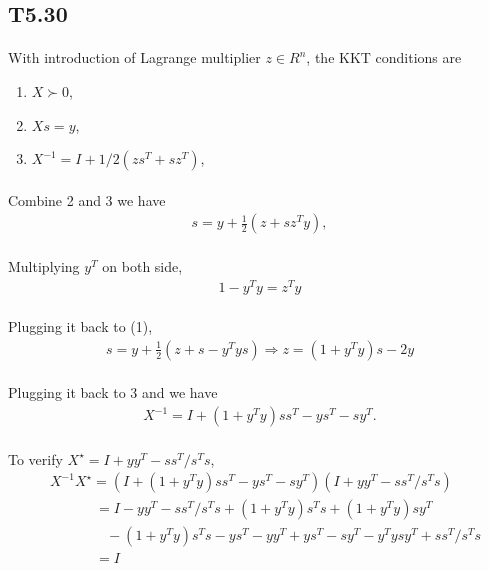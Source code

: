 \subsection*{T5.30}
\paragraph{}
With introduction of Lagrange multiplier $z \in R^n$, the KKT conditions are
\begin{enumerate}
	\item $X\succ 0$, 
	\item $Xs =y$,
	\item $X^{-1} = I +1/2(zs^T +sz^T)$,
\end{enumerate}
\paragraph{}
Combine 2 and 3 we have
\begin{align}
s = y +\frac{1}{2}(z+sz^Ty),
\end{align}
\paragraph{}
Multiplying $y^T$ on both side,
\begin{align*}
	1 -y^Ty =z^Ty
\end{align*}
\paragraph{}
Plugging it back to (1),
\begin{align*}
s = y +\frac{1}{2}(z+s-y^Tys) \Rightarrow z = (1+y^Ty)s -2y
\end{align*}
\paragraph{}
Plugging it back to 3 and we have
\begin{align*}
X^{-1} = I +(1+y^Ty)ss^T -ys^T-sy^T.
\end{align*}
\paragraph{}
To verify $X^\star = I +yy^T -ss^T/s^Ts$, 
\begin{align*}
&X^{-1}X^\star = (I +(1+y^Ty)ss^T -ys^T-sy^T)(I +yy^T -ss^T/s^Ts) \\
&\qquad \quad \ =I -yy^T -ss^T/s^Ts +(1+y^Ty)s^Ts +(1+y^Ty)sy^T \\
&\qquad \qquad -(1+y^Ty)s^Ts -ys^T-yy^T+ys^T-sy^T-y^Tysy^T+ss^T/s^Ts\\
&\qquad \quad \ = I
\end{align*}
